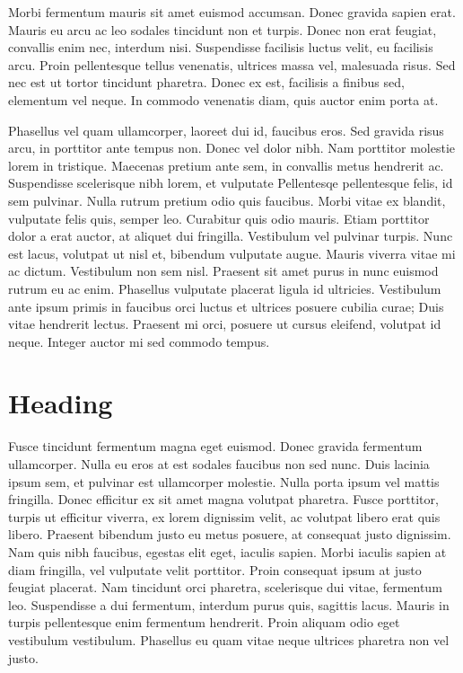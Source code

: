 \documentclass[12pt,a4paper,twoside, twocolumn]{article}
\begin{document}
Morbi fermentum mauris sit amet euismod accumsan. Donec gravida sapien erat. Mauris eu arcu ac leo sodales tincidunt non et turpis. Donec non erat feugiat, convallis enim nec, interdum nisi. Suspendisse facilisis luctus velit, eu facilisis arcu. Proin pellentesque tellus venenatis, ultrices massa vel, malesuada risus. Sed nec est ut tortor tincidunt pharetra. Donec ex est, facilisis a finibus sed, elementum vel neque. In commodo venenatis diam, quis auctor enim porta at.

Phasellus vel quam ullamcorper, laoreet dui id, faucibus eros. Sed gravida risus arcu, in porttitor ante tempus non. Donec vel dolor nibh.  Nam porttitor molestie lorem in tristique. Maecenas pretium ante sem, in convallis metus hendrerit ac.
Suspendisse scelerisque nibh lorem, et vulputate Pellentesqe pellentesque felis, id sem pulvinar. Nulla rutrum pretium odio quis faucibus. Morbi vitae ex blandit, vulputate felis quis, semper leo. Curabitur quis odio mauris. Etiam porttitor dolor a erat auctor, at aliquet dui fringilla. Vestibulum vel pulvinar turpis. Nunc est lacus, volutpat ut nisl et, bibendum vulputate augue. Mauris viverra vitae mi ac dictum. Vestibulum non sem nisl. Praesent sit amet purus in nunc euismod rutrum eu ac enim. Phasellus vulputate placerat ligula id ultricies. Vestibulum ante ipsum primis in faucibus orci luctus et ultrices posuere cubilia curae; Duis vitae hendrerit lectus. Praesent mi orci, posuere ut cursus eleifend, volutpat id neque. Integer auctor mi sed commodo tempus.

\section{Heading}
Fusce tincidunt fermentum magna eget euismod. Donec gravida fermentum ullamcorper. Nulla eu eros at est sodales faucibus non sed nunc. Duis lacinia ipsum sem, et pulvinar est ullamcorper molestie. Nulla porta ipsum vel mattis fringilla. Donec efficitur ex sit amet magna volutpat pharetra. Fusce porttitor, turpis ut efficitur viverra, ex lorem dignissim velit, ac volutpat libero erat quis libero. Praesent bibendum justo eu metus posuere, at consequat justo dignissim. Nam quis nibh faucibus, egestas elit eget, iaculis sapien. Morbi iaculis sapien at diam fringilla, vel vulputate velit porttitor. Proin consequat ipsum at justo feugiat placerat.
Nam tincidunt orci pharetra, scelerisque dui vitae, fermentum leo. Suspendisse a dui fermentum, interdum purus quis, sagittis lacus. Mauris in turpis pellentesque enim fermentum hendrerit. Proin aliquam odio eget vestibulum vestibulum. Phasellus eu quam vitae neque ultrices pharetra non vel justo. 
\end{document}

